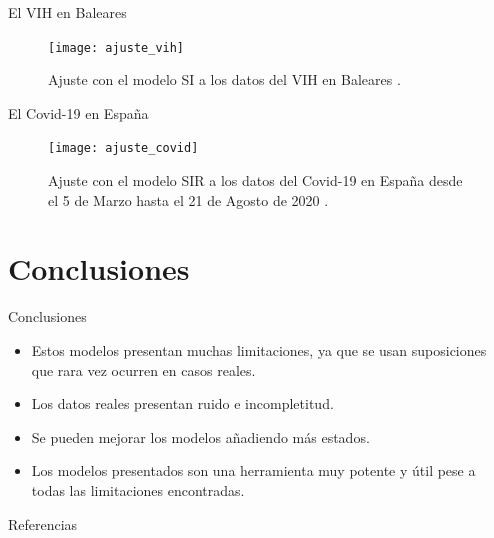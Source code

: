 \begin{frame}{El VIH en Baleares}

    \begin{figure}
        \begin{center}
        \caption{Ajuste con el modelo SI a los datos del VIH en Baleares \cite{datos_vih}.}
        \label{ajuste_vih}
        \texttt{[image: ajuste\_vih]}
        \end{center}
        \end{figure}
\end{frame}


\begin{frame}{El Covid-19 en España}
    \begin{figure}
        \begin{center}
        \caption{Ajuste con el modelo SIR a los datos del Covid-19 en España desde el 5 de Marzo hasta el 21 de Agosto de 2020 \cite{datos_covid}.}
        \label{ajuste_covid}
        \texttt{[image: ajuste\_covid]}
        \end{center}
        \end{figure}


\end{frame}




\section{Conclusiones}


\begin{frame}{Conclusiones}

    \begin{itemize}
        \item Estos modelos presentan muchas limitaciones, ya que se usan suposiciones que rara vez ocurren en casos reales.
        \item Los datos reales presentan ruido e incompletitud.
        \item Se pueden mejorar los modelos añadiendo más estados.
        \item Los modelos presentados son una herramienta muy potente y útil pese a todas las limitaciones encontradas.
    \end{itemize}

\end{frame}




\begin{frame}{Referencias}
    
    
\end{frame}


